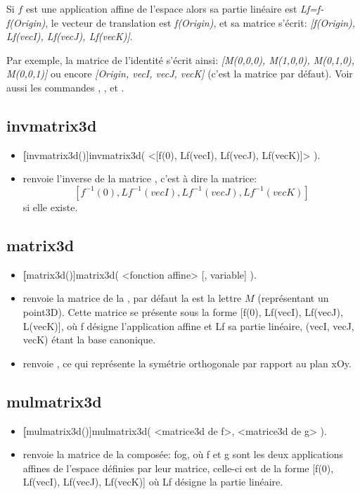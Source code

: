 Si $f$ est une application affine de l'espace alors sa partie linéaire est \textit{Lf=f-f(Origin)}, le vecteur de translation est \textit{f(Origin)}, et sa matrice s'écrit: \textit{[f(Origin), Lf(vecI), Lf(vecJ), Lf(vecK)]}. 

Par exemple, la matrice de l'identité s'écrit ainsi: \textit{[M(0,0,0), M(1,0,0), M(0,1,0), M(0,0,1)]} ou encore \textit{[Origin, vecI, vecJ, vecK]} (c'est la matrice par défaut). 
Voir aussi les commandes , ,  et .



\subsection{invmatrix3d}
\begin{itemize}
 \item \util \textbf[invmatrix3d()]{invmatrix3d( <[f(0), Lf(vecI), Lf(vecJ), Lf(vecK)]> )}.
 \item \desc renvoie l'inverse de la matrice , c'est à dire la matrice:
  \[[f^{-1}(0), Lf^{-1}(vecI), Lf^{-1}(vecJ), Lf^{-1}(vecK)]\] 
  si elle existe.
\end{itemize}


\subsection{matrix3d}
\begin{itemize}
 \item \util \textbf[matrix3d()]{matrix3d( <fonction affine> [, variable] )}.
 \item \desc renvoie la matrice de la , par défaut la  est la lettre $M$ (représentant un point3D). Cette matrice se présente sous la forme [f(0), Lf(vecI), Lf(vecJ), L(vecK)], où f désigne l'application affine et Lf sa partie linéaire, (vecI, vecJ, vecK) étant la base canonique.
 \item \exem {} renvoie \res{[0,0,1,0,i,0,0,-1]}, ce qui représente la symétrie orthogonale par rapport au plan xOy. 
\end{itemize}

\subsection{mulmatrix3d}
\begin{itemize}
 \item \util \textbf[mulmatrix3d()]{mulmatrix3d( <matrice3d de f>, <matrice3d de g> )}.
 \item \desc renvoie la matrice de la composée: fog, où f et g sont les deux applications affines de l'espace définies par leur matrice, celle-ci est de la forme [f(0), Lf(vecI), Lf(vecJ), Lf(vecK)] où Lf désigne la partie linéaire.
\end{itemize}


